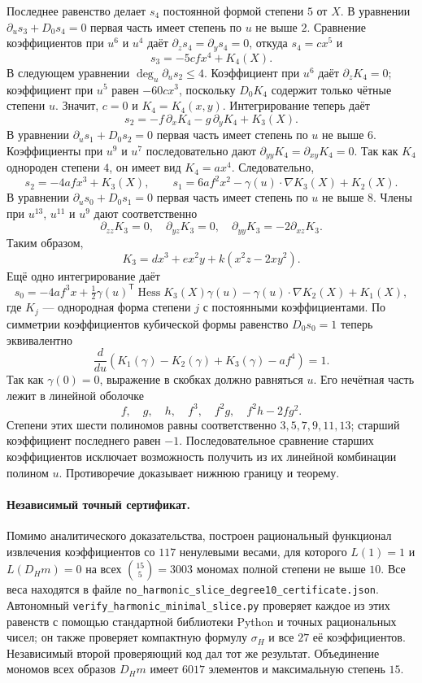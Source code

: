 Последнее равенство делает $s_4$ постоянной формой степени $5$ от $X$.
В уравнении $\partial_us_3+D_0s_4=0$ первая часть имеет степень по $u$
не выше $2$. Сравнение коэффициентов при $u^6$ и $u^4$ даёт
$\partial_zs_4=\partial_ys_4=0$, откуда $s_4=cx^5$ и
\[
 s_3=-5cf x^4+K_4(X).
\]
В следующем уравнении $\deg_u\partial_us_2\leq4$.
Коэффициент при $u^6$ даёт $\partial_zK_4=0$;
коэффициент при $u^5$ равен $-60cx^3$, поскольку $D_0K_4$
содержит только чётные степени $u$. Значит, $c=0$ и $K_4=K_4(x,y)$.
Интегрирование теперь даёт
\[
 s_2=-f\,\partial_xK_4-g\,\partial_yK_4+K_3(X).
\]
В уравнении $\partial_us_1+D_0s_2=0$ первая часть имеет степень по $u$
не выше $6$. Коэффициенты при $u^9$ и $u^7$ последовательно дают
$\partial_{yy}K_4=\partial_{xy}K_4=0$. Так как $K_4$ однороден степени $4$,
он имеет вид $K_4=a x^4$. Следовательно,
\[
 s_2=-4af x^3+K_3(X),\qquad
 s_1=6af^2x^2-\gamma(u)\cdot\nabla K_3(X)+K_2(X).
\]
В уравнении $\partial_us_0+D_0s_1=0$ первая часть имеет степень по $u$
не выше $8$. Члены при $u^{13}$, $u^{11}$ и $u^9$ дают соответственно
\[
 \partial_{zz}K_3=0,\quad \partial_{yz}K_3=0,\quad
 \partial_{yy}K_3=-2\partial_{xz}K_3.
\]
Таким образом,
\[
 K_3=d x^3+e x^2y+k(x^2z-2xy^2).
\]
Ещё одно интегрирование даёт
\[
 s_0=-4af^3x+\tfrac12\gamma(u)^{\mathsf T}
      \operatorname{Hess}K_3(X)\gamma(u)
      -\gamma(u)\cdot\nabla K_2(X)+K_1(X),
\]
где $K_j$ --- однородная форма степени $j$ с постоянными коэффициентами.
По симметрии коэффициентов кубической формы равенство $D_0s_0=1$
теперь эквивалентно
\[
 \frac{d}{du}\left(K_1(\gamma)-K_2(\gamma)+K_3(\gamma)-af^4\right)=1.
\]
Так как $\gamma(0)=0$, выражение в скобках должно равняться $u$.
Его нечётная часть лежит в линейной оболочке
\[
 f,\quad g,\quad h,\quad f^3,\quad f^2g,\quad f^2h-2fg^2.
\]
Степени этих шести полиномов равны соответственно $3,5,7,9,11,13$;
старший коэффициент последнего равен $-1$.
Последовательное сравнение старших коэффициентов исключает возможность
получить из их линейной комбинации полином $u$. Противоречие доказывает
нижнюю границу и теорему.

\paragraph{Независимый точный сертификат.}
Помимо аналитического доказательства, построен рациональный функционал
извлечения коэффициентов со $117$ ненулевыми весами, для которого
$L(1)=1$ и $L(D_Hm)=0$ на всех $\binom{15}{5}=3003$ мономах полной
степени не выше $10$. Все веса находятся в файле
\texttt{no\_harmonic\_slice\_degree10\_certificate.json}.
Автономный \texttt{verify\_harmonic\_minimal\_slice.py} проверяет
каждое из этих равенств с помощью стандартной библиотеки Python и
точных рациональных чисел; он также проверяет компактную формулу
$\sigma_H$ и все $27$ её коэффициентов.
Независимый второй проверяющий код дал тот же результат.
Объединение мономов всех образов $D_Hm$ имеет $6017$ элементов
и максимальную степень $15$.
